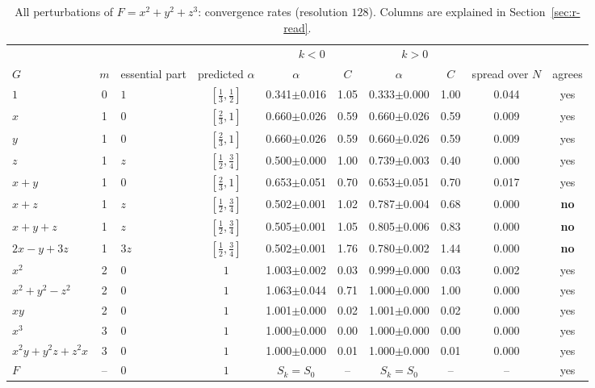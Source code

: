 \documentclass[12pt, a4paper, oneside]{book}
\theoremstyle{plain}
\theoremstyle{definition}
\theoremstyle{remark}
\theoremstyle{definition}
\begin{document}
\begin{table}[!h]
\centering
\footnotesize
\begin{adjustbox}{max width=\textwidth}
\begin{tabular}{l c l c c c c c c c}
\toprule
& & & & \multicolumn{2}{c}{$k<0$} & \multicolumn{2}{c}{$k>0$} & & \\
\cmidrule(lr){5-6}\cmidrule(lr){7-8}
$G$ & $m$ & essential part & predicted $\alpha$ & $\alpha$ & $C$ & $\alpha$ & $C$ & spread over $N$ & agrees \\
\midrule
$1$ & 0 & $1$ & $[\tfrac13,\tfrac12]$ & 0.341{\scriptsize$\pm$0.016} & 1.05 & 0.333{\scriptsize$\pm$0.000} & 1.00 & 0.044 & yes \\
$x$ & 1 & $0$ & $[\tfrac23,1]$ & 0.660{\scriptsize$\pm$0.026} & 0.59 & 0.660{\scriptsize$\pm$0.026} & 0.59 & 0.009 & yes \\
$y$ & 1 & $0$ & $[\tfrac23,1]$ & 0.660{\scriptsize$\pm$0.026} & 0.59 & 0.660{\scriptsize$\pm$0.026} & 0.59 & 0.009 & yes \\
$z$ & 1 & $z$ & $[\tfrac12,\tfrac34]$ & 0.500{\scriptsize$\pm$0.000} & 1.00 & 0.739{\scriptsize$\pm$0.003} & 0.40 & 0.000 & yes \\
$x+y$ & 1 & $0$ & $[\tfrac23,1]$ & 0.653{\scriptsize$\pm$0.051} & 0.70 & 0.653{\scriptsize$\pm$0.051} & 0.70 & 0.017 & yes \\
$x+z$ & 1 & $z$ & $[\tfrac12,\tfrac34]$ & 0.502{\scriptsize$\pm$0.001} & 1.02 & 0.787{\scriptsize$\pm$0.004} & 0.68 & 0.000 & \textbf{no} \\
$x+y+z$ & 1 & $z$ & $[\tfrac12,\tfrac34]$ & 0.505{\scriptsize$\pm$0.001} & 1.05 & 0.805{\scriptsize$\pm$0.006} & 0.83 & 0.000 & \textbf{no} \\
$2x-y+3z$ & 1 & $3z$ & $[\tfrac12,\tfrac34]$ & 0.502{\scriptsize$\pm$0.001} & 1.76 & 0.780{\scriptsize$\pm$0.002} & 1.44 & 0.000 & \textbf{no} \\
$x^2$ & 2 & $0$ & $1$ & 1.003{\scriptsize$\pm$0.002} & 0.03 & 0.999{\scriptsize$\pm$0.000} & 0.03 & 0.002 & yes \\
$x^2+y^2-z^2$ & 2 & $0$ & $1$ & 1.063{\scriptsize$\pm$0.044} & 0.71 & 1.000{\scriptsize$\pm$0.000} & 1.00 & 0.000 & yes \\
$xy$ & 2 & $0$ & $1$ & 1.001{\scriptsize$\pm$0.000} & 0.02 & 1.001{\scriptsize$\pm$0.000} & 0.02 & 0.000 & yes \\
$x^3$ & 3 & $0$ & $1$ & 1.000{\scriptsize$\pm$0.000} & 0.00 & 1.000{\scriptsize$\pm$0.000} & 0.00 & 0.000 & yes \\
$x^2y+y^2z+z^2x$ & 3 & $0$ & $1$ & 1.000{\scriptsize$\pm$0.000} & 0.01 & 1.000{\scriptsize$\pm$0.000} & 0.01 & 0.000 & yes \\
$F$ & -- & $0$ & $1$ & $S_k=S_0$ & -- & $S_k=S_0$ & -- & -- & yes \\
\bottomrule
\end{tabular}
\end{adjustbox}
\caption[Rates for $x^2+y^2+z^3$]{All perturbations of $F=x^2+y^2+z^3$: convergence rates (resolution $128$). Columns are explained in Section~\ref{sec:r-read}.}
\label{tab:r-A2a-rates}
\end{table}
\end{document}
